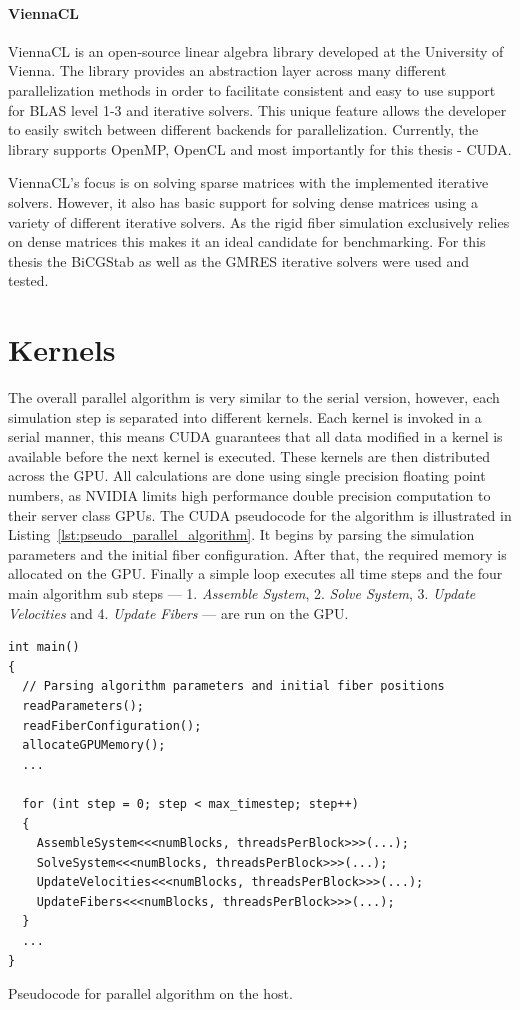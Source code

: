 \documentclass[a4paper,11pt]{kth-mag}
\begin{document}
\paragraph{ViennaCL}
ViennaCL is an open-source linear algebra library developed at the University of Vienna. The library provides an abstraction layer across many different parallelization methods in order to facilitate consistent and easy to use support for BLAS level 1-3 and iterative solvers. This unique feature allows the developer to easily switch between different backends for parallelization. Currently, the library supports OpenMP, OpenCL and most importantly for this thesis - CUDA.

ViennaCL's focus is on solving sparse matrices with the implemented iterative solvers. However, it also has basic support for solving dense matrices using a variety of different iterative solvers. As the rigid fiber simulation exclusively relies on dense matrices this makes it an ideal candidate for benchmarking. For this thesis the BiCGStab as well as the GMRES iterative solvers were used and tested.

\section{Kernels}
\label{sec:kernels}

The overall parallel algorithm is very similar to the serial version, however, each simulation step is separated into different kernels. Each kernel is invoked in a serial manner, this means CUDA guarantees that all data modified in a kernel is available before the next kernel is executed. These kernels are then distributed across the GPU. All calculations are done using single precision floating point numbers, as NVIDIA limits high performance double precision computation to their server class GPUs. The CUDA pseudocode for the algorithm is illustrated in Listing~\ref{lst:pseudo_parallel_algorithm}. It begins by parsing the simulation parameters and the initial fiber configuration. After that, the required memory is allocated on the GPU. Finally a simple loop executes all time steps and the four main algorithm sub steps — 1. \emph{Assemble System}, 2. \emph{Solve System}, 3. \emph{Update Velocities} and 4. \emph{Update Fibers} — are run on the GPU.

\begin{listing}[!htbp]
  \centering
  \begin{verbatim}
int main()
{
  // Parsing algorithm parameters and initial fiber positions
  readParameters();
  readFiberConfiguration();
  allocateGPUMemory();
  ...

  for (int step = 0; step < max_timestep; step++)
  {
    AssembleSystem<<<numBlocks, threadsPerBlock>>>(...);
    SolveSystem<<<numBlocks, threadsPerBlock>>>(...);
    UpdateVelocities<<<numBlocks, threadsPerBlock>>>(...);
    UpdateFibers<<<numBlocks, threadsPerBlock>>>(...);
  }
  ...
}
  \end{verbatim}
  \caption{Pseudocode for parallel algorithm on the host.}
  \label{lst:pseudo_parallel_algorithm}
\end{listing}
\end{document}
